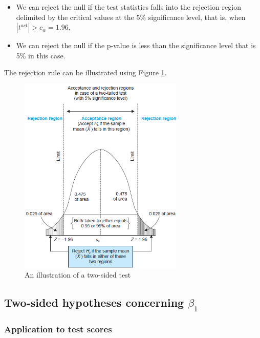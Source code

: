 \documentclass[a4paper,11pt]{article}
\begin{document}
\begin{itemize}
\begin{itemize}
\item We can reject the null if the test statistics falls into the
rejection region delimited by the critical values at the 5\%
significance level, that is, when \(|t^{act}| > c_{\alpha} = 1.96\),

\item We can reject the null if the p-value is less than the significance
level that is 5\% in this case.
\end{itemize}

The rejection rule can be illustrated using Figure \ref{fig:orga707ced}.

\begin{figure}[htbp]
\centering
\includegraphics[width=0.7\textwidth]{./figure/fig9_1.png}
\caption{\label{fig:orga707ced}
An illustration of a two-sided test}
\end{figure}
\end{itemize}


\subsection{Two-sided hypotheses concerning \(\beta_1\)}
\label{sec:org7e9c28d}

\subsubsection*{Application to test scores}
\label{sec:org0d036a3}
\end{document}
